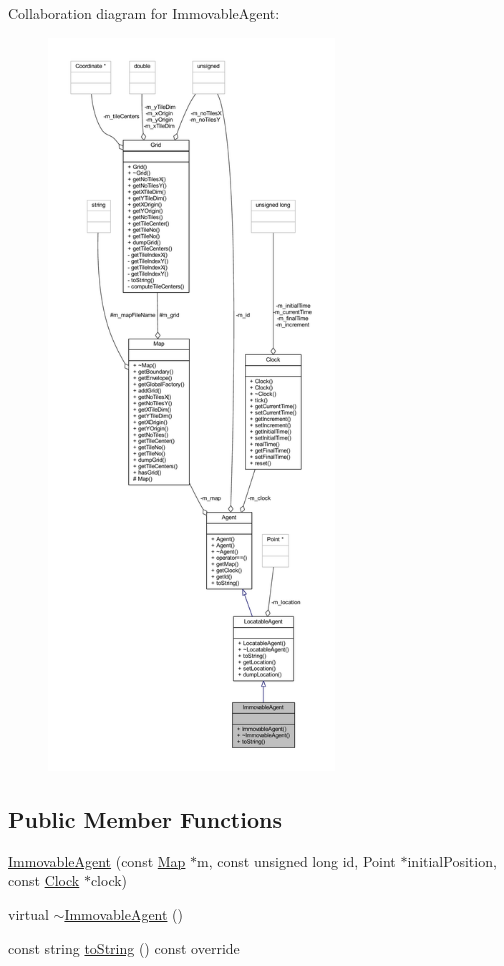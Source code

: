 Collaboration diagram for Immovable\+Agent\+:
\nopagebreak
\begin{figure}[H]
\begin{center}
\leavevmode
\includegraphics[height=550pt]{class_immovable_agent__coll__graph}
\end{center}
\end{figure}
\subsection*{Public Member Functions}
\begin{DoxyCompactItemize}
\item 
\hyperlink{class_immovable_agent_a0b4253828510a7212b77c5921a057900}{Immovable\+Agent} (const \hyperlink{class_map}{Map} $\ast$m, const unsigned long id, Point $\ast$initial\+Position, const \hyperlink{class_clock}{Clock} $\ast$clock)
\item 
virtual \hyperlink{class_immovable_agent_aa2dfb26891059da00ff897a7c6e6a47c}{$\sim$\+Immovable\+Agent} ()
\item 
const string \hyperlink{class_immovable_agent_a805b0d18035550d902d617a8c7ccc062}{to\+String} () const override
\end{DoxyCompactItemize}


